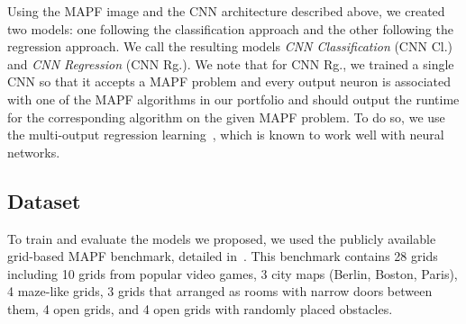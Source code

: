 \documentclass[letterpaper]{article} %
\newcommand\Roni[1]{\nb{\textbf{Roni:}}{red}{#1}}
\begin{document}
Using the MAPF image and the CNN architecture described above, we created two \AS models: one following the classification approach and the other following the regression approach. We call the resulting \AS models \emph{CNN Classification} (CNN Cl.)
and \emph{CNN Regression} (CNN Rg.). We note that for CNN Rg., we trained a single CNN so that it accepts a MAPF problem and every output neuron is associated with one of the MAPF algorithms in our portfolio and should output the runtime for the corresponding algorithm on the given MAPF problem. To do so, we use the multi-output regression learning~\cite{borchani2015survey}, which is known to work well with neural networks. 


\subsection{Dataset}
To train and evaluate the \AS models we proposed, we used the publicly available grid-based MAPF benchmark, detailed in~\cite{stern2019multiagent}. 
This benchmark contains 28 grids including 10 grids from popular video games, 3 city maps (Berlin, Boston, Paris), 4 maze-like grids, 3 grids that arranged as rooms with narrow doors between them, 4 open grids, and 4 open grids with randomly placed obstacles. 
\end{document}
